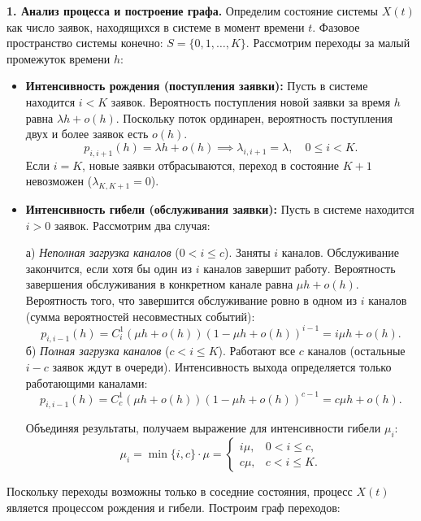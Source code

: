 \begin{eproof}
\textbf{1. Анализ процесса и построение графа.}
Определим состояние системы $X(t)$ как число заявок, находящихся в системе в момент времени $t$. Фазовое пространство системы конечно: $S = \{0, 1, \dots, K\}$.
Рассмотрим переходы за малый промежуток времени $h$:

\begin{itemize}
    \item \textbf{Интенсивность рождения (поступления заявки):}
    Пусть в системе находится $i < K$ заявок. Вероятность поступления новой заявки за время $h$ равна $\lambda h + o(h)$. Поскольку поток ординарен, вероятность поступления двух и более заявок есть $o(h)$.
    $$
    p_{i, i+1}(h) = \lambda h + o(h) \implies \lambda_{i, i+1} = \lambda, \quad 0 \le i < K.
    $$
    Если $i=K$, новые заявки отбрасываются, переход в состояние $K+1$ невозможен ($\lambda_{K, K+1} = 0$).

    \item \textbf{Интенсивность гибели (обслуживания заявки):}
    Пусть в системе находится $i > 0$ заявок. Рассмотрим два случая:
    
    а) \textit{Неполная загрузка каналов} ($0 < i \le c$). Заняты $i$ каналов. Обслуживание закончится, если хотя бы один из $i$ каналов завершит работу. Вероятность завершения обслуживания в конкретном канале равна $\mu h + o(h)$. Вероятность того, что завершится обслуживание ровно в одном из $i$ каналов (сумма вероятностей несовместных событий):
    $$
    p_{i, i-1}(h) = C_i^1 (\mu h + o(h))(1 - \mu h + o(h))^{i-1} = i\mu h + o(h).
    $$
    б) \textit{Полная загрузка каналов} ($c < i \le K$). Работают все $c$ каналов (остальные $i-c$ заявок ждут в очереди). Интенсивность выхода определяется только работающими каналами:
    $$
    p_{i, i-1}(h) = C_c^1 (\mu h + o(h))(1 - \mu h + o(h))^{c-1} = c\mu h + o(h).
    $$
    
    Объединяя результаты, получаем выражение для интенсивности гибели $\mu_i$:
    $$
    \mu_i = \min\{i, c\} \cdot \mu = 
    \begin{cases} 
    i\mu, & 0 < i \le c, \\
    c\mu, & c < i \le K.
    \end{cases}
    $$
\end{itemize}

Поскольку переходы возможны только в соседние состояния, процесс $X(t)$ является процессом рождения и гибели. Построим граф переходов:

\begin{center}
\end{center}
\end{eproof}
